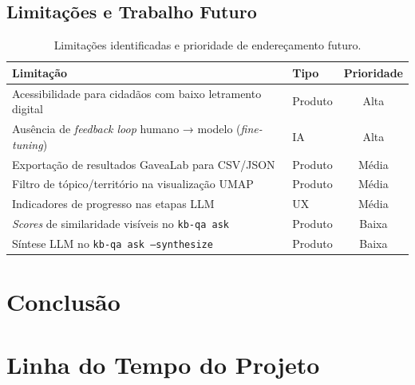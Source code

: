 \documentclass[12pt,a4paper]{article}
\begin{document}
\subsection{Limitações e Trabalho Futuro}
\label{sec:limitacoes}

\begin{table}[h!]
\centering
\small
\begin{tabular}{llc}
\toprule
\textbf{Limitação} & \textbf{Tipo} & \textbf{Prioridade} \\
\midrule
Acessibilidade para cidadãos com baixo letramento digital & Produto & Alta \\
Ausência de \textit{feedback loop} humano → modelo (\textit{fine-tuning}) & IA & Alta \\
Exportação de resultados GaveaLab para CSV/JSON & Produto & Média \\
Filtro de tópico/território na visualização UMAP & Produto & Média \\
Indicadores de progresso nas etapas LLM & UX & Média \\
\textit{Scores} de similaridade visíveis no \texttt{kb-qa ask} & Produto & Baixa \\
Síntese LLM no \texttt{kb-qa ask --synthesize} & Produto & Baixa \\
\bottomrule
\end{tabular}
\caption{Limitações identificadas e prioridade de endereçamento futuro.}
\end{table}

\section{Conclusão}


\printbibliography[title={Referências}]

\appendix

\section{Linha do Tempo do Projeto}
\end{document}
